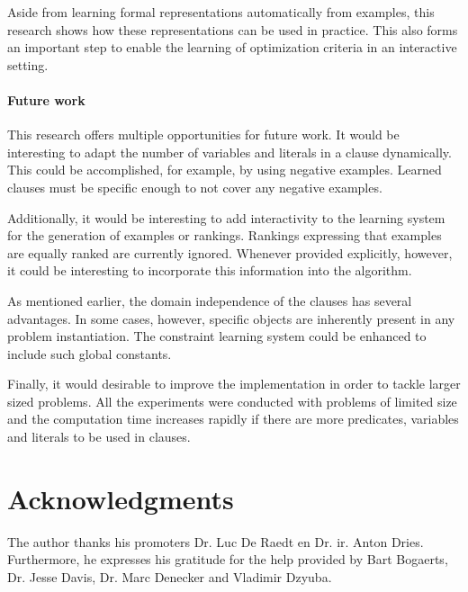 \documentclass[letterpaper]{article}
\theoremstyle{definition}
\begin{document}
Aside from learning formal representations automatically from examples, this research shows how these representations can be used in practice.
This also forms an important step to enable the learning of optimization criteria in an interactive setting.

\paragraph{Future work}
This research offers multiple opportunities for future work.
It would be interesting to adapt the number of variables and literals in a clause dynamically.
This could be accomplished, for example, by using negative examples.
Learned clauses must be specific enough to not cover any negative examples. 

Additionally, it would be interesting to add interactivity to the learning system for the generation of examples or rankings.
Rankings expressing that examples are equally ranked are currently ignored.
Whenever provided explicitly, however, it could be interesting to incorporate this information into the algorithm.

As mentioned earlier, the domain independence of the clauses has several advantages.
In some cases, however, specific objects are inherently present in any problem instantiation.
The constraint learning system could be enhanced to include such global constants.

Finally, it would desirable to improve the implementation in order to tackle larger sized problems.
All the experiments were conducted with problems of limited size and the computation time increases rapidly if there are more predicates, variables and literals to be used in clauses.

\section*{Acknowledgments}
The author thanks his promoters Dr. Luc De Raedt en Dr. ir. Anton Dries.
Furthermore, he expresses his gratitude for the help provided by Bart Bogaerts, Dr. Jesse Davis, Dr. Marc Denecker and Vladimir Dzyuba.

\newpage

%
%


\end{document}
